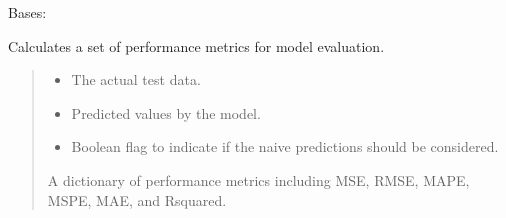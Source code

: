 \documentclass[letterpaper,10pt,english]{sphinxmanual}
\begin{document}
\begin{fulllineitems}
\label{\detokenize{docs/performance_measurement:performance_measurement.PerfMeasure}}
\pysigstartsignatures
{}
\pysigstopsignatures
\sphinxAtStartPar
Bases: 

\begin{fulllineitems}
\label{\detokenize{docs/performance_measurement:performance_measurement.PerfMeasure.get_performance_metrics}}
\pysigstartsignatures
{}
\pysigstopsignatures
\sphinxAtStartPar
Calculates a set of performance metrics for model evaluation.
\begin{quote}\begin{description}
\begin{itemize}
\item {} 
\sphinxAtStartPar
{} \textendash{} The actual test data.

\item {} 
\sphinxAtStartPar
{} \textendash{} Predicted values by the model.

\item {} 
\sphinxAtStartPar
{} \textendash{} Boolean flag to indicate if the naive predictions should be considered.

\end{itemize}

\sphinxAtStartPar
A dictionary of performance metrics including MSE, RMSE, MAPE, MSPE, MAE, and R\sphinxhyphen{}squared.

\end{description}\end{quote}

\end{fulllineitems}


\end{fulllineitems}
\end{document}
